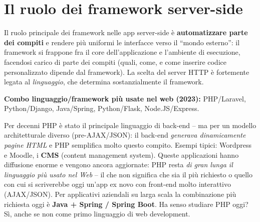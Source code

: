 \section{Il ruolo dei framework server-side}

Il ruolo principale dei framework nelle app server-side \`e \textbf{automatizzare parte dei
compiti} e rendere pi\`u uniformi le interfacce verso il ``mondo esterno'': il framework si
frappone fra il core dell'applicazione e l'ambiente di esecuzione, facendosi carico di parte
dei compiti (quali, come, e come inserire codice personalizzato dipende dal framework). La
scelta del server HTTP \`e fortemente legata al \emph{linguaggio}, che determina
sostanzialmente il framework.

\textbf{Combo linguaggio/framework pi\`u usate nel web (2023):} PHP/Laravel, Python/Django,
Java/Spring, Python/Flask, Node.JS/Express.

\begin{esempio}
Per decenni PHP \`e stato il principale linguaggio di back-end -- ma per un modello
architetturale diverso (pre-AJAX/JSON): il back-end \emph{generava dinamicamente pagine HTML}
e PHP semplifica molto questo compito. Esempi tipici: Wordpress e Moodle, i \textbf{CMS}
(content management system). Queste applicazioni hanno diffusione enorme e vengono ancora
aggiornate: PHP resta \emph{di gran lunga il linguaggio pi\`u usato nel Web} -- il che non
significa che sia il pi\`u richiesto o quello con cui si scriverebbe oggi un'app ex novo con
front-end molto interattivo (AJAX/JSON). Per applicativi aziendali su larga scala la
combinazione pi\`u richiesta oggi \`e \textbf{Java + Spring / Spring Boot}. Ha senso studiare
PHP oggi? S\`i, anche se non come primo linguaggio di web development.
\end{esempio}
